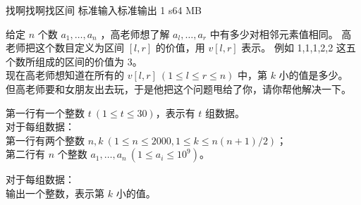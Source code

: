 \gdef\thisproblemauthor{xbhoneybee}
\begin{problem}{找啊找啊找区间}
{标准输入}{标准输出}
{1 s}{64 MB}{}

给定 $n$ 个数 $a_1,\dots ,a_n$ ，高老师想了解 $a_l,\dots ,a_r$ 中有多少对相邻元素值相同。
高老师把这个数目定义为区间 $[l,r]$ 的价值，用 $v[l,r]$ 表示。
例如 1,1,1,2,2 这五个数所组成的区间的价值为 3。\\
现在高老师想知道在所有的 $v[l,r]\ (1 \le l \le r \le n)$ 中，第 $k$ 小的值是多少。
但高老师要和女朋友出去玩，于是他把这个问题甩给了你，请你帮他解决一下。


\InputFile

第一行有一个整数 $t\ (1 \le t \le 30)$，表示有 $t$ 组数据。\\
对于每组数据：\\
第一行有两个整数 $n,k\ (1\le n\le 2000,1\le k\le n(n+1)/2)$；\\
第二行有 $n$ 个整数 $a_1,\dots ,a_n\ (1\le a_i\le 10^9)$。

\OutputFile

对于每组数据：\\
输出一个整数，表示第 $k$ 小的值。

\Example

\begin{example}
%
\end{example}

\end{problem}
